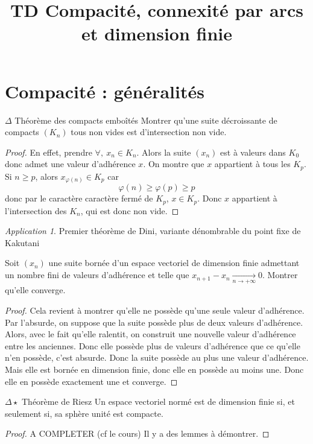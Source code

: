 \documentclass[french,a4paper]{article}
\title{TD Compacité, connexité par arcs et dimension finie}
\theoremstyle{plain}
\theoremstyle{definition}
\theoremstyle{remark}
\newtheorem*{app}{Application}
\begin{document}
\maketitle

\section{Compacité : généralités}

\begin{ex}{$\Delta$ Théorème des compacts emboîtés} Montrer qu'une suite décroissante de compacts $(K_n)$ tous non vides est d'intersection non vide.
\end{ex}
\begin{proof}
	En effet, prendre $\forall ,\ x_n\in K_n$. Alors la suite $(x_n)$ est à valeurs dans $K_0$ donc admet une valeur d'adhérence $x$. On montre que $x$ appartient à tous les $K_p$. Si $n\geqslant p$, alors $x_{\varphi(n)}\in K_p$ car $$\varphi(n)\geqslant\varphi(p)\geqslant p$$ donc par le caractère caractère fermé de $K_p$, $x\in K_p$. Donc $x$ appartient à l'intersection des $K_n$, qui est donc non vide.
\end{proof}
\begin{app}
	Premier théorème de Dini, variante dénombrable du point fixe de Kakutani
\end{app}

\begin{ex}[Moulin.01]{}
	Soit $(x_n)$ une suite bornée d'un espace vectoriel de dimension finie admettant un nombre fini de valeurs d'adhérence et telle que $x_{n+1}-x_n\xrightarrow[n\to+\infty]{}0$. Montrer qu'elle converge.
\end{ex}
\begin{proof}
	Cela revient à montrer qu'elle ne possède qu'une seule valeur d'adhérence. Par l'absurde, on suppose que la suite possède plus de deux valeurs d'adhérence. Alors, avec le fait qu'elle ralentit, on construit une nouvelle valeur d'adhérence entre les anciennes. Donc elle possède plus de valeurs d'adhérence que ce qu'elle n'en possède, c'est absurde. Donc la suite possède au plus une valeur d'adhérence. Mais elle est bornée en dimension finie, donc elle en possède au moins une. Donc elle en possède exactement une et converge.
\end{proof}

\begin{ex}{$\Delta\star$ Théorème de Riesz} Un espace vectoriel normé est de dimension finie si, et seulement si, sa sphère unité est compacte.
\end{ex}
\begin{proof}
	A COMPLETER (cf le cours) Il y a des lemmes à démontrer.
\end{proof}
\end{document}
